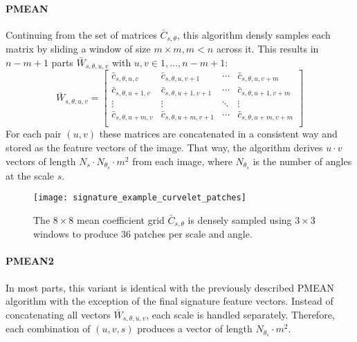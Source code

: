 \paragraph{PMEAN}

Continuing from the set of matrices $\bar{C}_{s, \theta}$, this algorithm
densly samples each matrix by sliding a window of size $m \times m, m < n$
across it. This results in $n - m + 1$ parts $\bar{W}_{s, \theta, u, v}$ with
$u, v \in 1, \dots, n - m + 1$:
\begin{equation*}
    \bar{W}_{s,\theta,u,v} =
    \begin{bmatrix}
        \bar{c}_{s,\theta,u,v} & \bar{c}_{s,\theta,u,v+1} & \cdots & \bar{c}_{s,\theta,u,v+m} \\
        \bar{c}_{s,\theta,u+1,v} & \bar{c}_{s,\theta,u+1,v+1} & \cdots & \bar{c}_{s,\theta,u+1,v+m} \\
        \vdots  & \vdots  & \ddots & \vdots  \\
        \bar{c}_{s,\theta,u+m,v} & \bar{c}_{s,\theta,u+m,v+1} & \cdots & \bar{c}_{s,\theta,u+m,v+m} \\
    \end{bmatrix}
\end{equation*}
For each pair $(u, v)$ these matrices are concatenated in a consistent way and
stored as the feature vectors of the image. That way, the algorithm derives $u
\cdot v$ vectors of length $N_s \cdot N_{\theta_s} \cdot m^2$ from each image,
where $N_{\theta_s}$ is the number of angles at the scale $s$.

\begin{figure}[h]
    \centering
    \texttt{[image: signature\_example\_curvelet\_patches]}%
    \caption[Patches on a coefficient grid]{
        The $8 \times 8$ mean coefficient grid $\bar{C}_{s, \theta}$ is densely
        sampled using $3 \times 3$ windows to produce $36$ patches per scale
        and angle.
    }
    \label{fig:patch_examples}
\end{figure}

\paragraph{PMEAN2}

In most parts, this variant is identical with the previously described PMEAN
algorithm with the exception of the final signature feature vectors. Instead of
concatenating all vectors $\bar{W}_{s, \theta, u, v}$, each scale is handled
separately. Therefore, each combination of $(u, v, s)$ produces a vector of
length $N_{\theta_s} \cdot m^2$.

